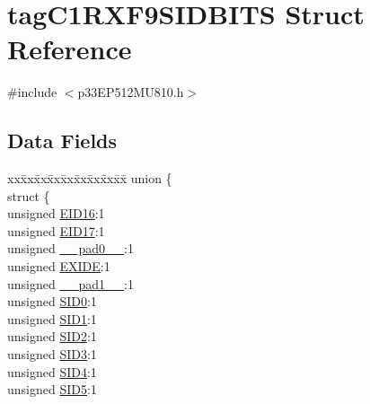 \hypertarget{structtag_c1_r_x_f9_s_i_d_b_i_t_s}{}\section{tag\+C1\+R\+X\+F9\+S\+I\+D\+B\+I\+TS Struct Reference}
\label{structtag_c1_r_x_f9_s_i_d_b_i_t_s}


{\ttfamily \#include $<$p33\+E\+P512\+M\+U810.\+h$>$}

\subsection*{Data Fields}
\begin{DoxyCompactItemize}
\item 
\begin{tabbing}
xx\=xx\=xx\=xx\=xx\=xx\=xx\=xx\=xx\=\kill
union \{\\
\>struct \{\\
\>\>unsigned \hyperlink{structtag_c1_r_x_f9_s_i_d_b_i_t_s_a6dd5663b0c9838c56db040560ca0efa1}{EID16}:1\\
\>\>unsigned \hyperlink{structtag_c1_r_x_f9_s_i_d_b_i_t_s_aa648615464b0eb29967529333eee9fd9}{EID17}:1\\
\>\>unsigned \hyperlink{structtag_c1_r_x_f9_s_i_d_b_i_t_s_adf71f3d8410c1f1dbbc96680a92c49af}{\_\_pad0\_\_}:1\\
\>\>unsigned \hyperlink{structtag_c1_r_x_f9_s_i_d_b_i_t_s_a09ff1c1be3927220bd3dfbc10edfe243}{EXIDE}:1\\
\>\>unsigned \hyperlink{structtag_c1_r_x_f9_s_i_d_b_i_t_s_acaf2d0924a107ec6e8d2e31febaf66f9}{\_\_pad1\_\_}:1\\
\>\>unsigned \hyperlink{structtag_c1_r_x_f9_s_i_d_b_i_t_s_a1ca276ac15df60e1f7b9a6d0011ade93}{SID0}:1\\
\>\>unsigned \hyperlink{structtag_c1_r_x_f9_s_i_d_b_i_t_s_a3405d354f81391f879648f69f504dfc8}{SID1}:1\\
\>\>unsigned \hyperlink{structtag_c1_r_x_f9_s_i_d_b_i_t_s_ad744966dfc49307f731b7045b01b94e5}{SID2}:1\\
\>\>unsigned \hyperlink{structtag_c1_r_x_f9_s_i_d_b_i_t_s_a9345f3e64720be93e83d8dfc827f3f45}{SID3}:1\\
\>\>unsigned \hyperlink{structtag_c1_r_x_f9_s_i_d_b_i_t_s_aefb106fed4bb40e2c3c71ac612c554e3}{SID4}:1\\
\>\>unsigned \hyperlink{structtag_c1_r_x_f9_s_i_d_b_i_t_s_a0f221b3c9612231686bf87ccdcec8489}{SID5}:1\\

\end{tabbing}
\end{DoxyCompactItemize}
